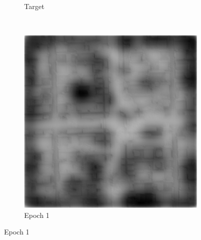 \documentclass[10pt,conference,compsocconf]{IEEEtran}
\begin{document}
\begin{figure}[!h]
\begin{subfigure}[b]{0.12\textwidth}
 		\caption{Target}
 	\end{subfigure}
 	~ %
 	\begin{subfigure}[b]{0.12\textwidth}
 		\includegraphics[width=\textwidth]{ep1.png}
 		\caption{Epoch 1}
 	\end{subfigure}


\end{figure}
\end{document}
